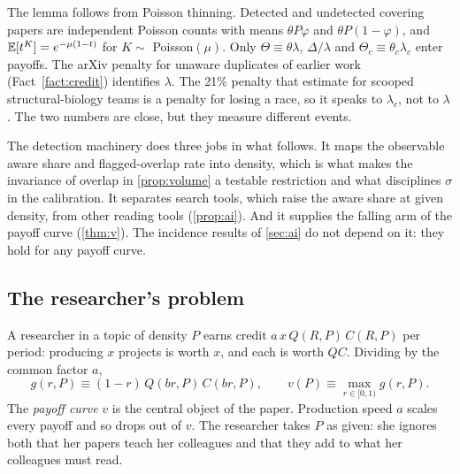The lemma follows from Poisson thinning. Detected and undetected covering
papers are independent Poisson counts with means $\theta P\varphi$ and
$\theta P(1-\varphi)$, and $\mathbb{E}[t^K]=e^{-\mu(1-t)}$ for $K\sim$ Poisson$(\mu)$.
Only $\Theta\equiv\theta\lambda$, $\Delta/\lambda$ and $\Theta_c\equiv\theta_c\lambda_c$
enter payoffs. The arXiv penalty for unaware duplicates of earlier work
(Fact~\ref{fact:credit}) identifies $\lambda$. The 21\% penalty that
\citet{hillstein2025} estimate for scooped structural-biology teams is a
penalty for losing a race, so it speaks to $\lambda_c$, not to $\lambda$. The
two numbers are close, but they measure different events.

The detection machinery does three jobs in what follows. It maps the
observable aware share and flagged-overlap rate into density, which is what
makes the invariance of overlap in \cref{prop:volume} a testable restriction
and what disciplines $\sigma$ in the calibration. It separates search tools,
which raise the aware share at given density, from other reading tools
(\cref{prop:ai}). And it supplies the falling arm of the payoff curve
(\cref{thm:v}). The incidence results of \cref{sec:ai} do not depend on it:
they hold for any payoff curve.

\subsection{The researcher's problem}

A researcher in a topic of density $P$ earns credit $a\,x\,Q(R,P)\,C(R,P)$ per
period: producing $x$ projects is worth $x$, and each is worth $QC$. Dividing
by the common factor $a$,
\begin{equation}\label{eq:g}
g(r,P)\equiv(1-r)\,Q(br,P)\,C(br,P),\qquad v(P)\equiv\max_{r\in[0,1)}g(r,P).
\end{equation}
The \emph{payoff curve} $v$ is the central object of the paper. Production
speed $a$ scales every payoff and so drops out of $v$. The researcher takes
$P$ as given: she ignores both that her papers teach her colleagues and that
they add to what her colleagues must read.

